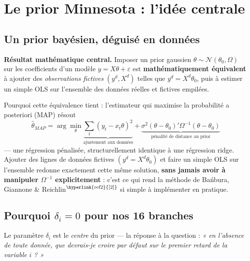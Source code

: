 \documentclass[11pt,a4paper]{article}
\newcommand{\cit}[1]{\textsuperscript{\hyperlink{ref#1}{[#1]}}}
\begin{document}
\section{Le prior Minnesota : l'idée centrale}

\subsection{Un prior bayésien, déguisé en données}

\begin{definitionbox}
\textbf{Résultat mathématique central.} Imposer un prior gaussien $\theta \sim \mathcal{N}(\theta_0, \Omega)$ sur les coefficients d'un modèle $y = X\theta + \varepsilon$ est \textbf{mathématiquement équivalent} à ajouter des \emph{observations fictives} $(y^d, X^d)$ telles que $y^d = X^d\theta_0$, puis à estimer un simple OLS sur l'ensemble des données réelles et fictives empilées.
\end{definitionbox}

Pourquoi cette équivalence tient : l'estimateur qui maximise la probabilité a posteriori (MAP) résout
\begin{equation}
\hat\theta_{MAP} = \arg\min_\theta \underbrace{\sum_t (y_t - x_t\theta)^2}_{\text{ajustement aux données}} + \underbrace{\sigma^2(\theta - \theta_0)'\Omega^{-1}(\theta-\theta_0)}_{\text{pénalité de distance au prior}}
\label{eq:map}
\end{equation}
--- une régression pénalisée, structurellement identique à une régression ridge. Ajouter des lignes de données fictives $(y^d=X^d\theta_0)$ et faire un simple OLS sur l'ensemble redonne exactement cette même solution, \textbf{sans jamais avoir à manipuler $\Omega^{-1}$ explicitement} : c'est ce qui rend la méthode de Bańbura, Giannone \& Reichlin$\cit{2}$ si simple à implémenter en pratique.

\subsection{Pourquoi $\delta_i = 0$ pour nos 16 branches}
\label{sec:delta}

Le paramètre $\delta_i$ est le \emph{centre} du prior --- la réponse à la question : \emph{« en l'absence de toute donnée, que devrais-je croire par défaut sur le premier retard de la variable $i$ ? »}
\end{document}

